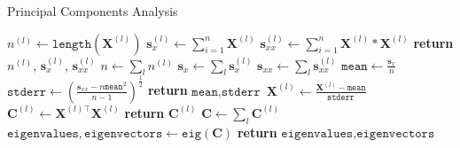\documentclass[10pt]{article}
\begin{document}

\begin{algorithm}

  \caption{Principal Components Analysis}

  \begin{algorithmic}[1] %
                \State $n^{(l)} \gets \texttt{length}(\mathbf{X}^{(l)})$ 
                \State $\mathbf{s}_x^{(l)} \gets \sum_{i = 1}^n \mathbf{X}^{(l)}$
                \State $\mathbf{s}_{xx}^{(l)} \gets \sum_{i = 1}^n \mathbf{X}^{(l)} * \mathbf{X}^{(l)}$ 
                \State \textbf{return} $n^{(l)}$, $\mathbf{s}_x^{(l)}$, $\mathbf{s}_{xx}^{(l)}$
          \EndProcedure
                \State $n \gets \sum_l n^{(l)}$
                \State $\mathbf{s}_x \gets \sum_l \mathbf{s}_x^{(l)}$
                \State $\mathbf{s}_{xx} \gets \sum_l \mathbf{s}_{xx}^{(l)}$
                \State $\texttt{mean} \gets \frac{\mathbf{s}_x}{n}$
                \State $\texttt{stderr} \gets \left( \frac{\mathbf{s}_{xx} - n \texttt{mean}^2}{n - 1} \right)^\frac{1}{2}$
                \State \textbf{return} $\texttt{mean}, \texttt{stderr}$
          \EndProcedure
                \State $\mathbf{X}^{(l)} \gets \frac{\mathbf{X}^{(l)} - \texttt{mean}}{\texttt{stderr}}$
                \State $\mathbf{C}^{(l)} \gets \mathbf{X}^{(l)\top} \mathbf{X}^{(l)}$
                \State \textbf{return} $\mathbf{C}^{(l)}$
        \EndProcedure
                \State $\mathbf{C} \gets \sum_l \mathbf{C}^{(l)}$
                \State $\texttt{eigenvalues}, \texttt{eigenvectors} \gets \texttt{eig}(\mathbf{C})$ 
                \State \textbf{return} $\texttt{eigenvalues}, \texttt{eigenvectors}$
        \EndProcedure
  \end{algorithmic}

\end{algorithm}
\end{document}
